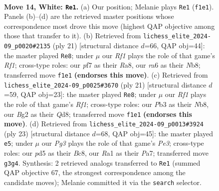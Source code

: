 \documentclass[11pt]{article}
\begin{document}
\begin{figure}[p]
\label{fig:thought-m24}
\end{figure}

\clearpage

\begin{figure}[p]\centering
\begin{subfigure}{0.46\textwidth}\centering
\resizebox{\linewidth}{!}{%
\newchessgame
\chessboard[
  setfen={2b2rk1/1p2qp1p/r1n2np1/p1bp4/P7/1P2PNP1/1B3PBP/RN1Q1RK1 w - - 2 14},
  showmover=false,
  pgfstyle=straightmove, color=movearrow, markmove={f1-e1}
]}
\caption{}
\end{subfigure}\hfill
\begin{subfigure}{0.46\textwidth}\centering
\resizebox{\linewidth}{!}{%
\newchessgame
\chessboard[
  setfen={rn1q1rk1/pp3pbp/3p2pn/2pP4/2P5/2NQ1P2/PP2N1PP/R1B2RK1 b - - 0 11},
  showmover=false,
  pgfstyle=straightmove, color=movearrow, markmove={f8-e8}
]}
\caption{}
\end{subfigure}
\\[4pt]
\begin{subfigure}{0.46\textwidth}\centering
\resizebox{\linewidth}{!}{%
\newchessgame
\chessboard[
  setfen={rn1q1rk1/pp3pp1/2pb1n1p/3p4/3P1B2/2NQP3/PP2NPPP/R4RK1 b - - 4 11},
  showmover=false,
  pgfstyle=straightmove, color=movearrow, markmove={f8-e8}
]}
\caption{}
\end{subfigure}\hfill
\begin{subfigure}{0.46\textwidth}\centering
\resizebox{\linewidth}{!}{%
\newchessgame
\chessboard[
  setfen={r1b2rk1/pppn1qp1/2nbp2p/3p4/3P2N1/2PB1N2/PP3PPP/R1BQ1RK1 b - - 0 12},
  showmover=false,
  pgfstyle=straightmove, color=movearrow, markmove={e6-e5}
]}
\caption{}
\end{subfigure}
\caption{\textbf{Move 14, White: \texttt{Re1}.} (a) Our position; Melanie plays \texttt{Re1} (\texttt{f1e1}). Panels (b)--(d) are the retrieved master positions whose correspondence most drove this move (highest QAP objective among those that transfer to it). (b) Retrieved from \texttt{lichess\_elite\_2024-09\_p0020\#2135} (ply 21) [structural distance $d$=66, QAP obj=44]: the master played \texttt{Re8}; under $\mu$ our \emph{Rf1} plays the role of that game's \emph{Rf1}; cross-type roles: our \emph{p}f7 as their \emph{R}a8, our \emph{r}a6 as their \emph{N}b8; transferred move \texttt{f1e1} \textbf{(endorses this move)}. (c) Retrieved from \texttt{lichess\_elite\_2024-09\_p0025\#3670} (ply 21) [structural distance $d$=59, QAP obj=23]: the master played \texttt{Re8}; under $\mu$ our \emph{Rf1} plays the role of that game's \emph{Rf1}; cross-type roles: our \emph{P}b3 as their \emph{N}b8, our \emph{B}g2 as their \emph{Q}d8; transferred move \texttt{f1e1} \textbf{(endorses this move)}. (d) Retrieved from \texttt{lichess\_elite\_2024-09\_p0013\#3924} (ply 23) [structural distance $d$=68, QAP obj=45]: the master played \texttt{e5}; under $\mu$ our \emph{Pg3} plays the role of that game's \emph{Pe3}; cross-type roles: our \emph{p}d5 as their \emph{B}c8, our \emph{R}a1 as their \emph{P}a7; transferred move \texttt{g3g4}. Synthesis: 2 retrieved analogs transferred to \texttt{Re1} (summed QAP objective 67, the strongest correspondence among the candidate moves); Melanie committed it via the \texttt{search} selector.}

\end{figure}
\end{document}
